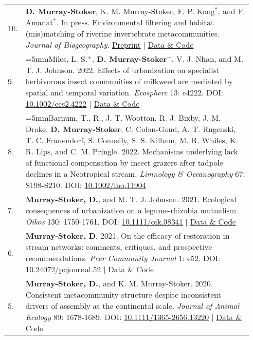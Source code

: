 \documentclass[letterpaper,11pt,oneside]{article}
\begin{document}
\def\arraystretch{1.4}
\noindent
\begin{longtable}{@{} p{0.5cm} >{\raggedright\arraybackslash}p{16.7cm}}
10. & \hangindent=5mm\textbf{D. Murray-Stoker}, K. M. Murray-Stoker, F. P. Kong$^{*}$, and F. Amanat$^{*}$. In press. Environmental filtering and habitat (mis)matching of riverine invertebrate metacommunities. \textit{Journal of Biogeography}. {\href{https://www.biorxiv.org/content/10.1101/2022.04.09.487317v2.abstract}{Preprint}} | {\href{https://zenodo.org/record/6800554#.Ys9CNOzML0o}{Data \& Code}} \\
9. & \hangindent=5mmMiles, L. S.$^{+}$, \textbf{D. Murray-Stoker}$^{+}$, V. J. Nhan, and M. T. J. Johnson. 2022. Effects of urbanization on specialist herbivorous insect communities of milkweed are mediated by spatial and temporal variation. \textit{Ecosphere} 13: e4222. DOI: {\href{http://onlinelibrary.wiley.com/doi/abs/10.1002/ecs2.4222}{10.1002/ecs2.4222}} | {\href{https://zenodo.org/record/6474064#.Ys9CEezML0o}{Data \& Code}} \\
8. & \hangindent=5mmBarnum, T., R., J. T. Wootton, R. J. Bixby, J. M. Drake, \textbf{D. Murray-Stoker}, C. Colon-Gaud, A. T. Rugenski, T. C. Frauendorf, S. Connelly, S. S. Kilham, M. R. Whiles, K. R. Lips, and C. M. Pringle. 2022. Mechanisms underlying lack of functional compensation by insect grazers after tadpole declines in a Neotropical stream. \textit{Limnology \& Oceanography} 67: S198-S210. DOI: {\href{https://aslopubs.onlinelibrary.wiley.com/doi/full/10.1002/lno.11904}{10.1002/lno.11904}} \\
7. & \hangindent=5mm\textbf{Murray-Stoker, D.}, and M. T. J. Johnson. 2021. Ecological consequences of urbanization on a legume-rhizobia mutualism. \textit{Oikos} 130: 1750-1761. DOI: {\href{https://onlinelibrary.wiley.com/doi/full/10.1111/oik.08341}{10.1111/oik.08341}} | {\href{https://zenodo.org/record/4459724#.YmVqvfPMIbl}{Data \& Code}} \\
6. & \hangindent=5mm\textbf{Murray-Stoker, D}. 2021. On the efficacy of restoration in stream networks: comments, critiques, and prospective recommendations. \textit{Peer Community Journal} 1: e52. DOI: {\href{https://peercommunityjournal.org/articles/10.24072/pcjournal.52/}{10.24072/pcjournal.52}} | {\href{https://doi.org/10.6084/m9.figshare.6448010.v7}{Data \& Code}} \\
5. & \hangindent=5mm\textbf{Murray-Stoker, D.}, and K. M. Murray-Stoker. 2020. Consistent metacommunity structure despite inconsistent drivers of assembly at the continental scale. \textit{Journal of Animal Ecology} 89: 1678-1689. DOI: {\href{http://besjournals.onlinelibrary.wiley.com/doi/abs/10.1111/1365-2656.13220}{10.1111/1365-2656.13220}} | {\href{https://osf.io/62je8/}{Data \& Code}} \\

\end{longtable}
\end{document}
